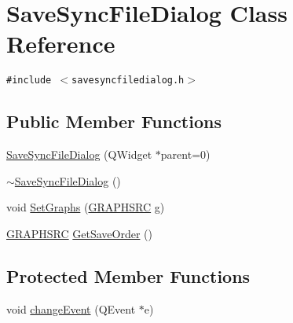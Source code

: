 \hypertarget{class_save_sync_file_dialog}{
\section{SaveSyncFileDialog Class Reference}
\label{class_save_sync_file_dialog}
}
{\tt \#include $<$savesyncfiledialog.h$>$}

\subsection*{Public Member Functions}
\begin{CompactItemize}
\item 
\hyperlink{class_save_sync_file_dialog_4f2afe785fab484ced94a0b9e1518690}{SaveSyncFileDialog} (QWidget $\ast$parent=0)
\item 
\hyperlink{class_save_sync_file_dialog_3e0469e66efab7874faa2ca9b84803e4}{$\sim$SaveSyncFileDialog} ()
\item 
void \hyperlink{class_save_sync_file_dialog_323d6d3c60360e40871f961d000a7940}{SetGraphs} (\hyperlink{savesyncfiledialog_8h_dc4594b144e880a867b5efe7979e0d35}{GRAPHSRC} g)
\item 
\hyperlink{savesyncfiledialog_8h_dc4594b144e880a867b5efe7979e0d35}{GRAPHSRC} \hyperlink{class_save_sync_file_dialog_a5eee73fcd8018437417415ab21fec54}{GetSaveOrder} ()
\end{CompactItemize}
\subsection*{Protected Member Functions}
\begin{CompactItemize}
\item 
void \hyperlink{class_save_sync_file_dialog_7e101b5c3d58be37c8c23a3a193d4bf7}{changeEvent} (QEvent $\ast$e)
\end{CompactItemize}
